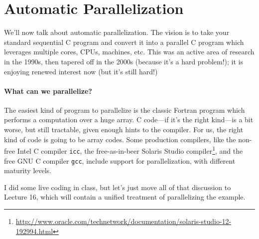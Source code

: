 \documentclass[11pt]{article}
\begin{document}
\section*{Automatic Parallelization}

We'll now talk about automatic parallelization. The vision is to take
your standard sequential C program and convert it into a parallel C
program which leverages multiple cores, CPUs, machines, etc.  This was
an active area of research in the 1990s, then tapered off in the 2000s
(because it's a hard problem!); it is enjoying renewed interest now (but
it's still hard!)

\paragraph{What can we parallelize?} The
easiest kind of program to parallelize is the classic Fortran program
which performs a computation over a huge array. C code---if it's the
right kind---is a bit worse, but still tractable, given enough hints
to the compiler. For us, the right kind of code is going to be array
codes. Some production compilers, like the non-free Intel C compiler
{\tt icc}, the free-as-in-beer Solaris Studio
compiler\footnote{\url{http://www.oracle.com/technetwork/documentation/solaris-studio-12-192994.html}},
and the free GNU C compiler {\tt gcc}, include support for
parallelization, with different maturity levels.

I did some live coding in class, but let's just move all of that discussion
to Lecture 16, which will contain a unified treatment of parallelizing
the example.
\end{document}
